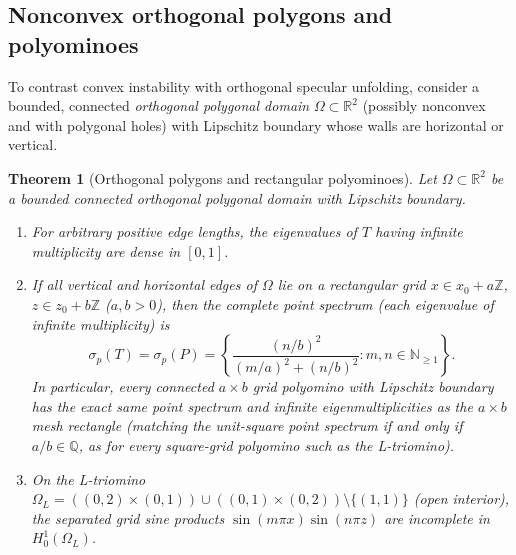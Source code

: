 \documentclass[11pt,reqno]{amsart}
\newtheorem{theorem}{Theorem}[section]
\theoremstyle{definition}
\theoremstyle{remark}
\newcommand{\R}{\mathbb{R}}
\newcommand{\Z}{\mathbb{Z}}
\newcommand{\N}{\mathbb{N}}
\newcommand{\Q}{\mathbb{Q}}
\begin{document}
\subsection{Nonconvex orthogonal polygons and polyominoes}
To contrast convex instability with orthogonal specular unfolding, consider a bounded, connected \emph{orthogonal polygonal domain} $\Omega \subset \R^2$ (possibly nonconvex and with polygonal holes) with Lipschitz boundary whose walls are horizontal or vertical.

\begin{theorem}[Orthogonal polygons and rectangular polyominoes]\label{thm:polyomino}
Let $\Omega \subset \R^2$ be a bounded connected orthogonal polygonal domain with Lipschitz boundary.
\begin{enumerate}
  \item For arbitrary positive edge lengths, the eigenvalues of $T$ having infinite multiplicity are dense in $[0,1]$.
  \item If all vertical and horizontal edges of $\Omega$ lie on a rectangular grid $x \in x_0 + a\Z$, $z \in z_0 + b\Z$ ($a, b > 0$), then the complete point spectrum (each eigenvalue of infinite multiplicity) is
  \begin{equation}\label{eq:polyomino-spec}
    \sigma_p(T) = \sigma_p(P) = \left\{ \frac{(n/b)^2}{(m/a)^2 + (n/b)^2} : m, n \in \N_{\ge 1} \right\}.
  \end{equation}
  In particular, every connected $a\times b$ grid polyomino with Lipschitz boundary has the exact same point spectrum and infinite eigenmultiplicities as the $a\times b$ mesh rectangle (matching the unit-square point spectrum if and only if $a/b \in \Q$, as for every square-grid polyomino such as the L-triomino).
  \item On the L-triomino $\Omega_L = ((0,2)\times(0,1)) \cup ((0,1)\times(0,2)) \setminus \{(1,1)\}$ (open interior), the separated grid sine products $\sin(m\pi x)\sin(n\pi z)$ are \emph{incomplete} in $H_0^1(\Omega_L)$.
\end{enumerate}
\end{theorem}
\end{document}
